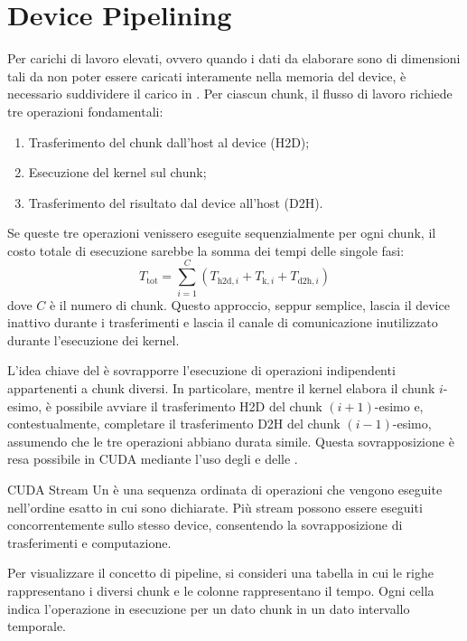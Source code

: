 \section{Device Pipelining}
Per carichi di lavoro elevati, ovvero quando i dati da elaborare sono di dimensioni tali da non poter essere caricati interamente nella memoria del device, è necessario suddividere il carico in . Per ciascun chunk, il flusso di lavoro richiede tre operazioni fondamentali:
\begin{enumerate}
    \item Trasferimento del chunk dall'host al device (H2D);
    \item Esecuzione del kernel sul chunk;
    \item Trasferimento del risultato dal device all'host (D2H).
\end{enumerate}
Se queste tre operazioni venissero eseguite sequenzialmente per ogni chunk, il costo totale di esecuzione sarebbe la somma dei tempi delle singole fasi:
\[
T_{\mathrm{tot}} = \sum_{i=1}^{C} \left( T_{\mathrm{h2d},i} + T_{\mathrm{k},i} + T_{\mathrm{d2h},i} \right)
\]
dove \(C\) è il numero di chunk. Questo approccio, seppur semplice, lascia il device inattivo durante i trasferimenti e lascia il canale di comunicazione inutilizzato durante l'esecuzione dei kernel.

L'idea chiave del  è sovrapporre l'esecuzione di operazioni indipendenti appartenenti a chunk diversi. In particolare, mentre il kernel elabora il chunk \(i\)-esimo, è possibile avviare il trasferimento H2D del chunk \((i+1)\)-esimo e, contestualmente, completare il trasferimento D2H del chunk \((i-1)\)-esimo, assumendo che le tre operazioni abbiano durata simile.
Questa sovrapposizione è resa possibile in CUDA mediante l'uso degli  e delle .

\begin{definition}{CUDA Stream}
    Un  è una sequenza ordinata di operazioni che vengono eseguite nell'ordine esatto in cui sono dichiarate. Più stream possono essere eseguiti concorrentemente sullo stesso device, consentendo la sovrapposizione di trasferimenti e computazione.
\end{definition}

Per visualizzare il concetto di pipeline, si consideri una tabella in cui le righe rappresentano i diversi chunk e le colonne rappresentano il tempo. Ogni cella indica l'operazione in esecuzione per un dato chunk in un dato intervallo temporale.


